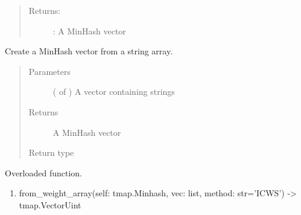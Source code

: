 \documentclass[letterpaper,10pt,english]{sphinxmanual}
\begin{document}
\begin{fulllineitems}
\begin{fulllineitems}
\begin{enumerate}
\begin{quote}
\begin{description}
\item[{Returns:}] \leavevmode
{}: A MinHash vector

\end{description}
\end{quote}

\end{enumerate}

\end{fulllineitems}


\begin{fulllineitems}
\label{\detokenize{documentation:tmap.Minhash.from_string_array}}
Create a MinHash vector from a string array.
\begin{quote}\begin{description}
\item[{Parameters}] \leavevmode
{} ( of ) \textendash{} A vector containing strings

\item[{Returns}] \leavevmode
A MinHash vector

\item[{Return type}] \leavevmode
{}

\end{description}\end{quote}

\end{fulllineitems}


\begin{fulllineitems}
\label{\detokenize{documentation:tmap.Minhash.from_weight_array}}
Overloaded function.
\begin{enumerate}
\def\theenumi{\arabic{enumi}}
\def\labelenumi{\theenumi .}
\makeatletter\def\p@enumii{\p@enumi \theenumi .}\makeatother
\item {} 
from\_weight\_array(self: tmap.Minhash, vec: list, method: str=’ICWS’) -\textgreater{} tmap.VectorUint
\begin{quote}


\end{quote}
\end{enumerate}
\end{fulllineitems}
\end{fulllineitems}
\end{document}
